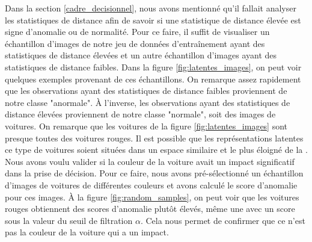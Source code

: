 Dans la section \ref{cadre_decisionnel}, nous avons mentionné qu'il fallait analyser les statistiques de distance afin de savoir si une statistique de distance élevée est signe d'anomalie ou de \DIFaddbegin {}\DIFaddend normalité\DIFaddbegin {}\DIFaddend . Pour ce faire, il suffit de visualiser un échantillon d'images de notre jeu de données d'entraînement ayant des statistiques de distance élevées et un autre échantillon d'images ayant des statistiques de distance faibles. Dans la figure \ref{fig:latentes_images}, on peut voir quelques exemples provenant de ces échantillons. On remarque assez rapidement que les observations ayant des statistiques de distance faibles proviennent de notre classe "anormale". À l'inverse, les observations ayant des statistiques de distance élevées proviennent de notre classe "normale", soit des images de voitures. On remarque que les voitures de la figure \ref{fig:latentes_images} sont presque toutes des voitures rouges. Il est possible que les représentations latentes \DIFaddbegin {}\DIFaddend ce type de voitures soient situées dans un espace similaire et le plus éloigné de la \DIFdelbegin {}\DIFdelend \DIFaddbegin {}\DIFaddend . Nous avons voulu valider si la couleur de la voiture avait un impact significatif dans la prise de décision. Pour ce faire, nous avons pré-sélectionné un échantillon d'images de voitures de différentes couleurs et avons calculé le score d'anomalie pour ces images. À la figure \ref{fig:random_samples}, on peut voir que les voitures rouges obtiennent des scores d'anomalie plutôt élevés, même une avec un score sous la valeur du seuil de filtration $\alpha$. Cela nous permet de confirmer que ce n'est pas \DIFaddbegin {}\DIFaddend la couleur de la voiture \DIFdelbegin {}\DIFdelend qui a un impact.

